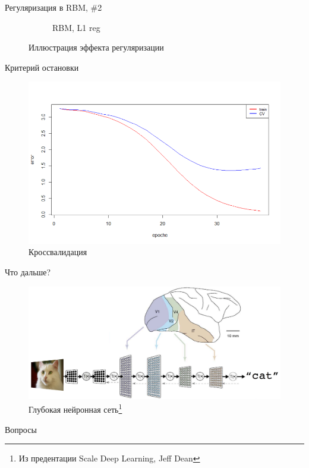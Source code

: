 \documentclass[10pt]{beamer}
\begin{document}
\begin{frame}{Регуляризация в RBM, \#2}
\begin{figure}
\begin{subfigure}[b]{0.5\textwidth}
                \caption{RBM, L1 reg}                
        \end{subfigure} 
        \caption{Иллюстрация эффекта регуляризации}
\end{figure}

\end{frame}

\begin{frame}{Критерий остановки}

\begin{figure}[h!]
  \centering
  \includegraphics[width=1\textwidth]{images/cv.png}
  \caption{Кроссвалидация}
\end{figure}	
	
\end{frame}


\begin{frame}{Что дальше?}
\begin{figure}[h!]
  \centering
  \includegraphics[width=1\textwidth]{images/deepnet1.png}
  \caption{Глубокая нейронная сеть\footnote{Из предентации Scale Deep Learning, Jeff Dean}}
\end{figure}	
\end{frame}



\begin{frame}[plain]
\begin{center}
{\Large Вопросы}
\end{center}
\end{frame}
\end{document}
